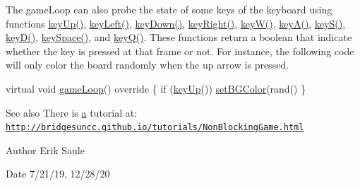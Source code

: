 The game\+Loop can also probe the state of some keys of the keyboard using functions \hyperlink{classbridges_1_1game_1_1_non_blocking_game_a0a93cf74e7eac55c33f76cd55d525084}{key\+Up()}, \hyperlink{classbridges_1_1game_1_1_non_blocking_game_a9b7ba679dd177b28f84ea24b9924a51c}{key\+Left()}, \hyperlink{classbridges_1_1game_1_1_non_blocking_game_a52dd79aaaee9da77fa392fb8ec37fa94}{key\+Down()}, \hyperlink{classbridges_1_1game_1_1_non_blocking_game_afbea1fa2acec16e952be66ce76d496a9}{key\+Right()}, \hyperlink{classbridges_1_1game_1_1_non_blocking_game_a7bd5c2ab845e24525649dda7f8dfd460}{key\+W()}, \hyperlink{classbridges_1_1game_1_1_non_blocking_game_af88089437e34df580b247cb27047fd14}{key\+A()}, \hyperlink{classbridges_1_1game_1_1_non_blocking_game_a75ece5d4fa35893ecacc82c5064c05e0}{key\+S()}, \hyperlink{classbridges_1_1game_1_1_non_blocking_game_a932979445cc8acea618092b83b4a9756}{key\+D()}, \hyperlink{classbridges_1_1game_1_1_non_blocking_game_a54beca154b58b0e0fb26c75983ba5072}{key\+Space()}, and \hyperlink{classbridges_1_1game_1_1_non_blocking_game_af0dafefbad315fbfb01851a4a0dfa93e}{key\+Q()}. These functions return a boolean that indicate whether the key is pressed at that frame or not. For instance, the following code will only color the board randomly when the up arrow is pressed.


\begin{DoxyCode}
\textcolor{keyword}{virtual} \textcolor{keywordtype}{void} \hyperlink{classbridges_1_1game_1_1_game_base_a16fb787bc65be1a582cddcfba3a0c5bb}{gameLoop}()\textcolor{keyword}{ override }\{
  \textcolor{keywordflow}{if} (\hyperlink{classbridges_1_1game_1_1_non_blocking_game_a0a93cf74e7eac55c33f76cd55d525084}{keyUp}())
    \hyperlink{classbridges_1_1game_1_1_game_base_ab667bbca1c81e5fb3aa8d81d70fe8cd2}{setBGColor}(rand()%
\}
\end{DoxyCode}


\begin{DoxySeeAlso}{See also}
There is \hyperlink{namespacebridges_1_1game_ab9a19c7ab6e2ebac2f95180e21733487a0cc175b9c0f1b6a831c399e269772661}{a} tutorial at\+: \href{http://bridgesuncc.github.io/tutorials/NonBlockingGame.html}{\tt http\+://bridgesuncc.\+github.\+io/tutorials/\+Non\+Blocking\+Game.\+html}
\end{DoxySeeAlso}
\begin{DoxyAuthor}{Author}
Erik Saule 
\end{DoxyAuthor}
\begin{DoxyDate}{Date}
7/21/19, 12/28/20 
\end{DoxyDate}
